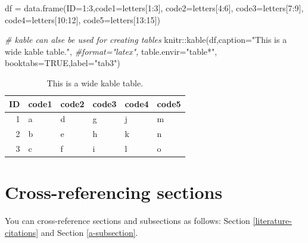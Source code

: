 \documentclass[webpdf,large,contemporary,namedate]{oup-authoring-template}
\newenvironment{Shaded}{\begin{snugshade}}{\end{snugshade}}
\newcommand{\AttributeTok}[1]{\textcolor[rgb]{0.77,0.63,0.00}{#1}}
\newcommand{\CommentTok}[1]{\textcolor[rgb]{0.56,0.35,0.01}{\textit{#1}}}
\newcommand{\ConstantTok}[1]{\textcolor[rgb]{0.00,0.00,0.00}{#1}}
\newcommand{\DecValTok}[1]{\textcolor[rgb]{0.00,0.00,0.81}{#1}}
\newcommand{\FunctionTok}[1]{\textcolor[rgb]{0.00,0.00,0.00}{#1}}
\newcommand{\NormalTok}[1]{#1}
\newcommand{\OtherTok}[1]{\textcolor[rgb]{0.56,0.35,0.01}{#1}}
\newcommand{\SpecialCharTok}[1]{\textcolor[rgb]{0.00,0.00,0.00}{#1}}
\newcommand{\StringTok}[1]{\textcolor[rgb]{0.31,0.60,0.02}{#1}}
\theoremstyle{thmstyleone}
\theoremstyle{thmstyletwo}
\theoremstyle{thmstylethree}
\begin{document}
\begin{Shaded}
\begin{Highlighting}[]
\NormalTok{df }\OtherTok{=} \FunctionTok{data.frame}\NormalTok{(}\AttributeTok{ID=}\DecValTok{1}\SpecialCharTok{:}\DecValTok{3}\NormalTok{,}\AttributeTok{code1=}\NormalTok{letters[}\DecValTok{1}\SpecialCharTok{:}\DecValTok{3}\NormalTok{],}
                \AttributeTok{code2=}\NormalTok{letters[}\DecValTok{4}\SpecialCharTok{:}\DecValTok{6}\NormalTok{],}
                \AttributeTok{code3=}\NormalTok{letters[}\DecValTok{7}\SpecialCharTok{:}\DecValTok{9}\NormalTok{],}
                \AttributeTok{code4=}\NormalTok{letters[}\DecValTok{10}\SpecialCharTok{:}\DecValTok{12}\NormalTok{],}
                \AttributeTok{code5=}\NormalTok{letters[}\DecValTok{13}\SpecialCharTok{:}\DecValTok{15}\NormalTok{])}

\CommentTok{\# kable can alse be used for creating tables}
\NormalTok{knitr}\SpecialCharTok{::}\FunctionTok{kable}\NormalTok{(df,}\AttributeTok{caption=}\StringTok{"This is a wide kable table."}\NormalTok{,}
             \CommentTok{\#format="latex",}
             \AttributeTok{table.envir=}\StringTok{"table*"}\NormalTok{,}
             \AttributeTok{booktabs=}\ConstantTok{TRUE}\NormalTok{,}\AttributeTok{label=}\StringTok{"tab3"}\NormalTok{)}
\end{Highlighting}
\end{Shaded}

\begin{table}

\caption{\label{tab:tab3}This is a wide kable table.}
\centering
\begin{tabular}[t]{rlllll}
\toprule
ID & code1 & code2 & code3 & code4 & code5\\
\midrule
1 & a & d & g & j & m\\
2 & b & e & h & k & n\\
3 & c & f & i & l & o\\
\bottomrule
\end{tabular}
\end{table}

\hypertarget{cross-referencing-sections}{%
\section{Cross-referencing sections}\label{cross-referencing-sections}}

You can cross-reference sections and subsections as follows: Section
\ref{literature-citations} and Section \ref{a-subsection}.
\end{document}
